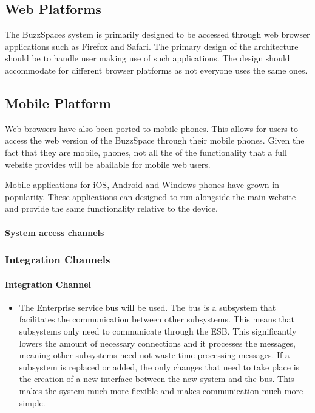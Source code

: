 \documentclass[10pt]{article}
\begin{document}
\subsection{Web Platforms}
The BuzzSpaces system is primarily designed to be accessed through web browser applications such as Firefox and Safari. The primary design of the architecture should be to handle user making use of such applications. The design should accommodate for different browser platforms as not everyone uses the same ones.


\subsection{Mobile Platform}
Web browsers have also been ported to mobile phones. This allows for users to access the web version of the BuzzSpace through their mobile phones. Given the fact that they are mobile, phones, not all the of the functionality that a full website provides will be abailable for mobile web users.

Mobile applications for iOS, Android and Windows phones have grown in popularity. These applications can designed to run alongside the main website and provide the same functionality relative to the device. 

\paragraph{System access channels}
\subsubsection{Integration Channels}
\paragraph{Integration Channel}
\begin{itemize}
\item \hfill The Enterprise service bus will be used. The bus is a subsystem that facilitates the communication between other subsystems. This means that subsystems only need to communicate through the ESB. This significantly lowers the amount of necessary connections and it processes the messages, meaning other subsystems need not waste time processing messages. If a subsystem is replaced or added, the only changes that need to take place is the creation of a new interface between the new system and the bus. This makes the system much more flexible  and makes communication much more simple.
\end{itemize}
\end{document}
